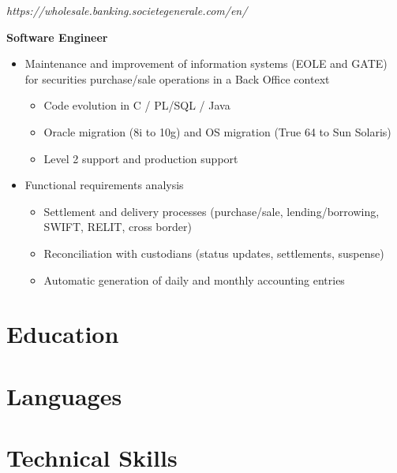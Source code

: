 \documentclass[11pt,a4paper]{moderncv}
\begin{document}
\bigskip
{}
{
	\textit{https://wholesale.banking.societegenerale.com/en/}

	\bigskip
	\textbf{Software Engineer}
\bigskip
\begin{itemize}
\item Maintenance and improvement of information systems (EOLE and GATE) for securities purchase/sale operations in a Back Office context
	\begin{itemize}
		\item Code evolution in C / PL/SQL / Java
		\item Oracle migration (8i to 10g) and OS migration (True 64 to Sun Solaris)
		\item Level 2 support and production support
\end{itemize}
\bigskip
\item Functional requirements analysis
	\begin{itemize}
		\item Settlement and delivery processes (purchase/sale, lending/borrowing, SWIFT, RELIT, cross border)
		\item Reconciliation with custodians (status updates, settlements, suspense)
		\item Automatic generation of daily and monthly accounting entries
	\end{itemize}
\end{itemize}
}
\bigskip

\section{Education}



\section{Languages}

\section{Technical Skills}
\bigskip
\end{document}
